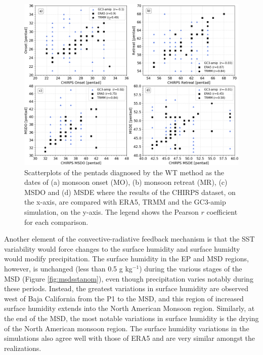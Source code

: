 \begin{figure}[t!]
\includegraphics[width=\linewidth]{figures/master_sst_scatter.png}
\caption[Scatter plot of SST vs precipitation]{Scatterplots of the pentads diagnosed by the WT method as the dates of (a) monsoon onset (MO), (b) monsoon retreat (MR), (c) MSDO and (d) MSDE where the results of the CHIRPS dataset, on the x-axis, are compared with ERA5, TRMM and the GC3-amip simulation, on the y-axis. The legend shows the Pearson $r$ coefficient for each comparison. }
\label{fig:amipsstscatter}
\end{figure}

Another element of the convective-radiative feedback mechanism is that the SST variability would force changes to the surface humidity and surface humidty would modify precipitation. The surface humidity in the EP and MSD regions, however, is unchanged (less than 0.5 g kg$^{-1}$) during the various stages of the MSD (Figure \ref{fig:msdsstanom}), even though precipitation varies notably during these periods. Instead, the greatest variations in surface humidity are observed west of Baja California from the P1 to the MSD, and this region of increased surface humidity extends into the North American Monsoon region. Similarly, at the end of the MSD, the most notable variations in surface humidity is the drying of the North American monsoon region.
 The surface humidity variations in the simulations also agree well with those of ERA5 and are very similar amongst the realizations.


